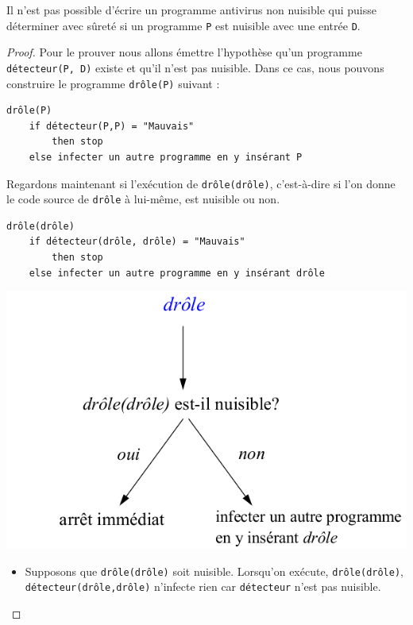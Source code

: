 \begin{mytheo}
	Il n'est pas possible d'écrire un programme antivirus non nuisible
	qui puisse déterminer avec sûreté
	si un programme \lstinline|P| est nuisible avec une entrée \lstinline|D|.
\end{mytheo}
\begin{proof}
Pour le prouver nous allons émettre l'hypothèse qu'un programme \lstinline|détecteur(P, D)| existe et qu'il n'est pas nuisible. Dans ce cas, nous pouvons construire le programme \lstinline|drôle(P)| suivant :

\label{lst:detecteur_de_virus}
\begin{lstlisting}
drôle(P)
    if détecteur(P,P) = "Mauvais"
        then stop
    else infecter un autre programme en y insérant P
\end{lstlisting}

Regardons maintenant si l'exécution de \lstinline|drôle(drôle)|, c'est-à-dire si l'on donne le code source de \lstinline|drôle| à lui-même, est nuisible ou non.
\begin{lstlisting}
drôle(drôle)
    if détecteur(drôle, drôle) = "Mauvais"
	    then stop
    else infecter un autre programme en y insérant drôle
\end{lstlisting}

\begin{center}
\includegraphics[scale=0.5]{Images/drole_de_drole.png}
\end{center}

\begin{itemize}
	\item Supposons que \lstinline|drôle(drôle)| soit nuisible.
      Lorsqu'on exécute, \lstinline|drôle(drôle)|,
      \lstinline|détecteur(drôle,drôle)| n'infecte rien car \lstinline|détecteur| n'est pas nuisible.


\end{itemize}
\end{proof}
